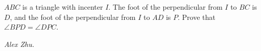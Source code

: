 $ABC$ is a triangle with incenter $I$. The foot of the perpendicular from $I$ to $BC$ is $D$, and the foot of the perpendicular from $I$ to $AD$ is $P$. Prove that $\angle BPD = \angle DPC$.

\textit{Alex Zhu.}